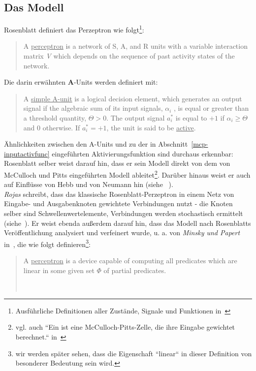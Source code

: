 \subsection{Das Modell}

Rosenblatt definiert das Perzeptron wie folgt\footnote{
    Ausführliche Definitionen aller Zustände, Signale und Funktionen in~\cite[79 - 94]{Ros62}
}:

\blockquote[{\cite[83 ``DEFINITION 17``; Hervorhebung i.O.]{Ros62}}]{
    A \underline{perceptron} is a network of S, A, and R units with a variable interaction matrix \textit{V} which depends on the
    sequence of past activity states of the network.
}

Die darin erwähnten \textbf{A}-Units werden definiert mit:

\blockquote[{\cite[81  ``DEFINITION 9``; Hervorhebung i.O.]{Ros62}}]{
    A \underline{simple A-unit} is a logical decision element, which
    generates an output signal if the algebraic sum of its
    input signals, $\alpha_i$ , is equal or greater than a threshold
    quantity, $\Theta > 0$. The output signal $a^*_i$ is equal to $+1$ if $\alpha_i \geq \Theta$ and $0$ otherwise. If $a^*_i = +1$,
    the unit is said to be \underline{active}.
}


Ähnlichkeiten zwischen den A-Units und zu der in Abschnitt~\ref{mcp-inputactivfunc} eingeführten Aktivierungsfunktion sind durchaus erkennbar: Rosenblatt selber weist darauf hin, dass er sein Modell direkt von dem von McCulloch und Pitts eingeführten Modell ableitet\footnote{
    vgl. auch ``Ein  ist eine McCulloch-Pitts-Zelle, die ihre Eingabe gewichtet berechnet.`` in~\cite[57, ``Definition 3.1``; Hervorhebung i.O.]{Roj93}
}. Darüber hinaus weist er auch auf Einflüsse von Hebb und von Neumann hin (siehe ~\cite[5]{Ros62}).\\


\textit{Rojas} schreibt, dass das klassische Rosenblatt-Perzeptron in einem Netz von Eingabe- und Ausgabenknoten gewichtete Verbindungen nutzt - die Knoten selber sind Schwellenwertelemente, Verbindungen werden stochastisch ermittelt (siehe~\cite[51]{Roj93}).
Er weist ebenda außerdem darauf hin, dass das Modell nach Rosenblatts Veröffentlichung analysiert und verfeinert wurde, u. a. von \textit{Minsky und Papert} in~\cite{MP88}, die wie folgt definieren\footnote{wir werden später sehen, dass die Eigenschaft ``linear`` in dieser Definition von besonderer Bedeutung sein wird.}:

\blockquote[{~\cite[12; Hervorhebung i.O.]{MP88}}]{
    A \underline{perceptron} is a device capable of computing all predicates which are linear in some given set $\Phi$ of partial predicates.
}

